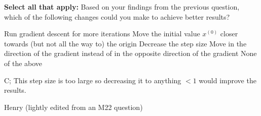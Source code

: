 \begin{parts}
\begin{subparts}
\subpart[2] \textbf{Select all that apply:} Based on your findings from the previous question, which of the following changes could you make to achieve better results?
{%
\checkboxchar{$\Box$} \checkedchar{$\blacksquare$} %
\begin{checkboxes}
    \choice Run gradient descent for more iterations
    \choice Move the initial value $x^{(0)}$ closer towards (but not all the way to) the origin
    \choice Decrease the step size
    \choice Move in the direction of the gradient instead of in the opposite direction of the gradient
    \choice None of the above
\end{checkboxes}
}
\begin{soln}
   C; This step size is too large so decreasing it to anything $<1$ would improve the results. 
\end{soln}
\begin{qauthor}
    Henry (lightly edited from an M22 question)
\end{qauthor}
\end{subparts}

\end{parts}